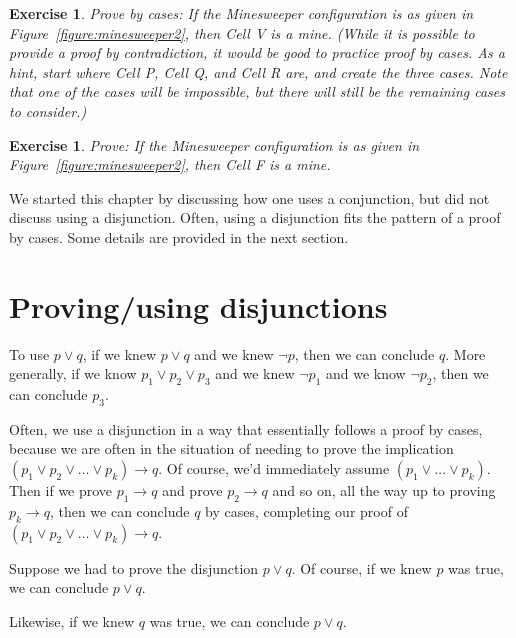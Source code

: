 \documentclass{book}
\newcounter{ekcounter}%
\theoremstyle{ekimcustom}
\newtheorem{exercise}[ekcounter]{Exercise}
\begin{document}
\begin{exercise}
Prove by cases: If the Minesweeper configuration is as given in Figure~\ref{figure:minesweeper2}, then Cell V is a mine. (While it is possible to provide a proof by contradiction, it would  be good to practice proof by cases. As a hint, start where Cell P, Cell Q, and Cell R are, and create the three cases. Note that one of the cases will be impossible, but there will still be the remaining cases to consider.)
\end{exercise}

\begin{exercise}
Prove: If the Minesweeper configuration is as given in Figure~\ref{figure:minesweeper2}, then Cell F is a mine.
\end{exercise}

We started this chapter by discussing how one uses a conjunction, but did not discuss using a disjunction. Often, using a disjunction fits the pattern of a proof by cases. Some details are provided in the next section.


\section{Proving/using disjunctions}

To use $p \vee q$, if we knew $p \vee q$ and we knew $\neg p$, then we can conclude $q$. More generally, if we know $p_1 \vee p_2 \vee p_3$ and we knew $\neg p_1$ and we know $\neg p_2$, then we can conclude $p_3$.

Often, we use a disjunction in a way that essentially follows a proof by cases, because we are often in the situation of needing to prove the implication $(p_1 \vee p_2 \vee \dots \vee p_k) \rightarrow q$. Of course, we'd immediately assume $(p_1 \vee \dots \vee p_k)$. Then if we prove $p_1 \rightarrow q$ and prove $p_2 \rightarrow q$ and so on, all the way up to proving $p_k \rightarrow q$, then we can conclude $q$ by cases, completing our proof of $(p_1 \vee p_2 \vee \dots \vee p_k) \rightarrow q$.

Suppose we had to prove the disjunction $p \vee q$. Of course, if we knew $p$ was true, we can conclude $p \vee q$.
\begin{center}
\end{center}
Likewise, if we knew $q$ was true, we can conclude $p \vee q$.
\end{document}
